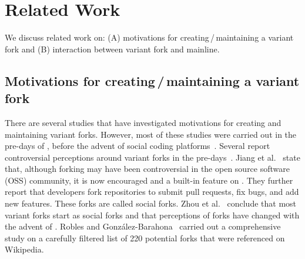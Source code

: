 
\section{Related Work}
\label{sec:background}
We discuss related work on: (A) motivations for creating\,/\,maintaining a variant fork and (B) interaction between variant fork and mainline.%



\subsection{Motivations for creating\,/\,maintaining a variant fork}
\label{sec:motivations}

There are several studies that have investigated motivations for creating and maintaining variant forks. However, most of these studies were carried out in the pre-\gh days of \sourceforge, before the advent of social coding platforms~\cite{Linus:2012Perspectives,Gregorio:2012,Viseur:2012Forks,Linus:2013CodeForking,Laurent:2008,Linus:2011ToFork}. Several  report controversial perceptions around variant forks in the pre-\gh days~\cite{Chua:Forking:2017,Dixion:2009Forks,Ernst:2010,Linus:2011ToFork,Linus:2014Hackers,Raymond:Cathedral:2001,pete}.
Jiang et al.~\cite{Lo:2017} state that, although forking may have been controversial in the open source software (OSS) community, it is now encouraged and a built-in feature on \gh. They further report that developers fork repositories to submit pull requests, fix bugs, and add new features. These forks are called social forks.
Zhou et al.~\cite{Zhou:2020} conclude that most variant forks start as social forks
and that perceptions of forks have changed with the advent of \gh.
Robles and Gonz{\'a}lez-Barahona~\cite{Gregorio:2012} carried out a comprehensive study on a carefully filtered list of 220 potential forks that were referenced on Wikipedia. %

